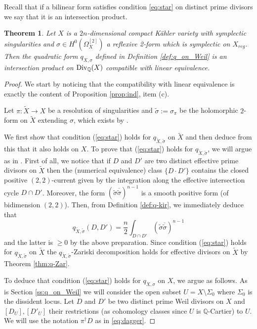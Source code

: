 \documentclass[12pt,reqno]{amsart}
\def\Q{{\mathbb Q}}
\def\Div{\mathop{\rm Div}\nolimits}
\def\tilde{\widetilde}
\newtheorem{thm}{Theorem}[section]
\theoremstyle{plain}
\theoremstyle{definition}
\begin{document}
Recall that if a bilinear form satisfies condition \eqref{eq:star} on distinct prime  divisors we say that it is an  intersection product.
\begin{thm}\label{thm:gen}
Let $X$ is a $2n$-dimensional compact K\"ahler variety with symplectic singularities and $\sigma\in H^0(\Omega^{[2]}_X)$ a reflexive 2-form which is symplectic on $X_{reg}$. 
Then  the quadratic form $q_{X,\sigma}$ defined in Definition \ref{def:q_on_Weil} is an intersection product on $\Div_{\Q}(X)$ compatible with linear equivalence.
\end{thm}
\begin{proof}

We start by noticing that the compatibility with linear equivalence is exactly the content of Proposition \ref{prop:ind}, item (c).

Let $ \pi: \tilde X\to X$ be a resolution of singularities and $\tilde \sigma:=\sigma_{\pi}$ be the holomorphic $2$-form on $\tilde X$ extending $\sigma$, which exists by \cite[Theorem 1.4]{KS}. 
 
We first show that condition (\ref{eq:star}) holds for $q_{\tilde X,\tilde \sigma}$ on $\tilde X$ and then deduce from this that it also holds on $X$. To prove that (\ref{eq:star}) holds for $q_{\tilde X,\tilde \sigma}$,  we will argue as in  \cite{Boucksom1}. First of all, we notice that if $D$ and $D'$ are two distinct effective prime divisors on $\tilde X$  then the (numerical equivalence) class $\{D \cdot D'\}$ contains the closed positive $(2,2)$-current given by the integration along the effective intersection cycle $D\cap D'$.  Moreover, the form $(\tilde \sigma \overline {\tilde \sigma})^{n-1}$ is a smooth positive form (of bidimension $(2,2)$). Then, from Definition \ref{def:q-kir}, we immediately deduce that
$$
q_{\tilde X,\tilde \sigma}(D,D')= \frac{n}{2}\int_{D\cap D'} (\tilde\sigma \overline{ \tilde\sigma})^{n-1}
$$
and the latter is $\geq 0$ by the above preparation. Since condition (\ref{eq:star}) holds for $q_{\tilde X,{\tilde \sigma}}$ on $\tilde X$ the $q_{\tilde X,{\tilde \sigma}}$-Zariski decomposition holds for effective divisors on $\tilde X$ by Theorem \ref{thm:q-Zar}. 

To deduce that condition (\ref{eq:star}) holds for $q_{X,\sigma}$ on $X$, we argue as follows. 
As is Section \ref{ss:q_on_Weil} we will consider the open subset
$U=X\setminus \Sigma_0$ where $\Sigma_0$ is the dissident locus. 
Let $D$ and $D'$ be two distinct prime Weil divisors on $X$ and $[D_U], [D'_U]$ their restrictions (as cohomology classes since $U$ is $\Q$-Cartier) to $U$. We will use the notation $\pi^\dagger D$ as in \eqref{eq:dagger}. 
 

\end{proof}
\end{document}
